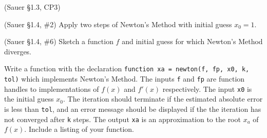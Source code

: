 \documentclass[12pt,fleqn]{exam}
\begin{document}
\begin{questions}

\question (Sauer \S1.3, CP3)


\question (Sauer \S1.4, \#2) Apply two steps of Newton's Method with initial guess $x_0 = 1$.


\question (Sauer \S1.4, \#6) Sketch a function $f$ and initial guess for which Newton's Method diverges.

\question Write a function with the declaration \verb$function xa = newton(f, fp, x0, k, tol)$ which implements Newton's Method. The inputs \verb$f$ and \verb$fp$ are function handles to implementations of $f(x)$ and $f'(x)$ respectively. The input \verb$x0$ is the initial guess $x_0$. The iteration should terminate if the estimated absolute error is less than \verb$tol$, and an error message should be displayed if the the iteration has not converged after \verb$k$ steps. The output \verb$xa$ is an approximation to the root $x_a$ of $f(x)$. Include a listing of your function.


\end{questions}
\end{document}
